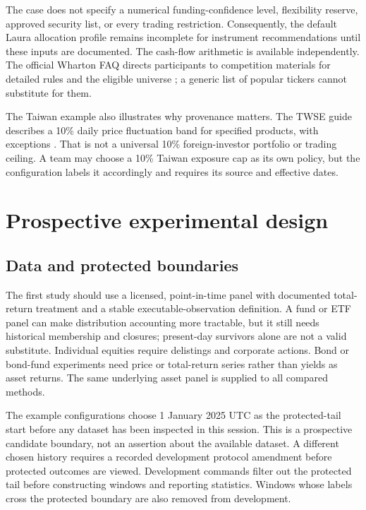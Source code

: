 \documentclass[11pt,a4paper]{article}
\begin{document}
The case does not specify a numerical funding-confidence level, flexibility reserve, approved security list, or every trading restriction. Consequently, the default Laura allocation profile remains incomplete for instrument recommendations until these inputs are documented. The cash-flow arithmetic is available independently. The official Wharton FAQ directs participants to competition materials for detailed rules and the eligible universe \citep{wharton2026}; a generic list of popular tickers cannot substitute for them.

The Taiwan example also illustrates why provenance matters. The TWSE guide describes a 10\% daily price fluctuation band for specified products, with exceptions \citep{twse2025}. That is not a universal 10\% foreign-investor portfolio or trading ceiling. A team may choose a 10\% Taiwan exposure cap as its own policy, but the configuration labels it accordingly and requires its source and effective dates.

\section{Prospective experimental design}

\subsection{Data and protected boundaries}

The first study should use a licensed, point-in-time panel with documented total-return treatment and a stable executable-observation definition. A fund or ETF panel can make distribution accounting more tractable, but it still needs historical membership and closures; present-day survivors alone are not a valid substitute. Individual equities require delistings and corporate actions. Bond or bond-fund experiments need price or total-return series rather than yields as asset returns. The same underlying asset panel is supplied to all compared methods.

The example configurations choose 1 January 2025 UTC as the protected-tail start before any dataset has been inspected in this session. This is a prospective candidate boundary, not an assertion about the available dataset. A different chosen history requires a recorded development protocol amendment before protected outcomes are viewed. Development commands filter out the protected tail before constructing windows and reporting statistics. Windows whose labels cross the protected boundary are also removed from development.
\end{document}
